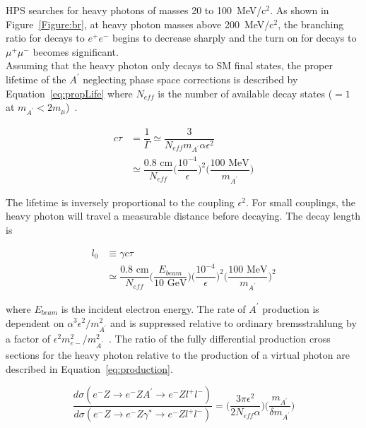 HPS searches for heavy photons of masses 20 to 100~MeV/c$^2$. As shown in Figure~\ref{Figure:br}, at heavy photon masses above 200~MeV/c$^2$, the branching ratio for decays to $e^+e^-$ begins to decrease sharply and the turn on for decays to $\mu^+\mu^-$ becomes significant. \\
\indent Assuming that the heavy photon only decays to SM final states, the proper lifetime of the $A^{\prime}$ neglecting phase space corrections is described by Equation~\eqref{eq:propLife} where $N_{eff}$ is the number of available decay states ($=1$ at $m_{A^{\prime}}<2m_{\mu}$)~\cite{bjorken_new_2009}. 

\begin{equation}
	\label{eq:propLife}
	\begin{split}
	c\tau &= \dfrac{1}{\Gamma}\simeq \dfrac{3}{N_{eff}m_{A^{\prime}}\alpha\epsilon^2}\\
	&\simeq \dfrac{0.8\textrm{ cm}}{N_{eff}}\Big({\dfrac{10^{-4}}{\epsilon}}\Big)^2\Big(\dfrac{100\textrm{ MeV}}{m_{A^{\prime}}}\Big)
	\end{split}
\end{equation}

The lifetime is inversely proportional to the coupling $\epsilon^2$. For small couplings, the heavy photon will travel a measurable distance before decaying. The decay length is 

\begin{equation}
	\label{eq:decayL}
	\begin{split}
	l_0 &\equiv \gamma c \tau \\
	&\simeq \dfrac{0.8\textrm{ cm}}{N_{eff}}\Big(\dfrac{E_{beam}}{10\textrm{ GeV}}\Big)\Big({\dfrac{10^{-4}}{\epsilon}}\Big)^2\Big(\dfrac{100\textrm{ MeV}}{m_{A^{\prime}}}\Big)^2
	\end{split}
\end{equation}

where $E_{beam}$ is the incident electron energy. The rate of $A^{\prime}$ production is dependent on $\alpha^3\epsilon^2/m_{A^{\prime}}^2$ and is suppressed relative to ordinary bremsstrahlung by a factor of $\epsilon^2m_{e-}^2/m_{A^{\prime}}^2$~\cite{bjorken_new_2009}. The ratio of the fully differential production cross sections for the heavy photon relative to the production of a virtual photon are described in Equation~\eqref{eq:production}.

\begin{equation}
	\label{eq:production}
	\dfrac{d\sigma(e^-Z\rightarrow e^-ZA^{\prime}\rightarrow e^-Zl^+l^-)}{d\sigma(e^-Z\rightarrow e^-Z\gamma^{\ast}\rightarrow e^-Zl^+l^-)} = \Big(\dfrac{3\pi\epsilon^2}{2N_{eff}\alpha}\Big) \Big(\dfrac{m_{A^{\prime}}}{\delta m_{A^{\prime}}}\Big)
\end{equation}

